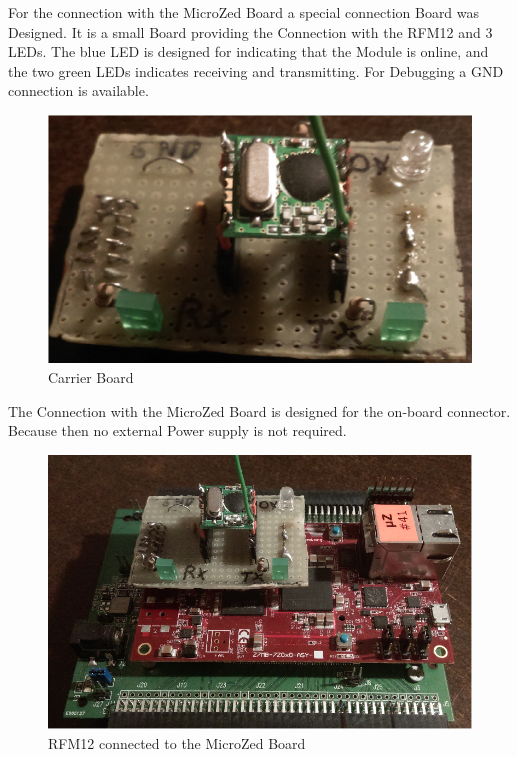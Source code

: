 For the connection with the MicroZed Board a special connection Board was Designed. It is a small Board providing the Connection with the RFM12 and 3 LEDs. The blue LED is designed for indicating that the Module is online, and the two green LEDs indicates receiving and transmitting. For Debugging a GND connection is available.

\begin{figure}[H]
	\centering
		\includegraphics[width=1.00\textwidth]{picture/rfm12_carier.png}
	\caption{Carrier Board}
	\label{fig:rfm12}
\end{figure}

The Connection with the MicroZed Board is designed for the on-board connector. Because then no external Power supply is not required.

\begin{figure}[H]
	\centering
		\includegraphics[width=1.00\textwidth]{picture/rfm12_carier_zynq.png}
	\caption{RFM12 connected to the MicroZed Board}
	\label{fig:rfm12}
\end{figure}


